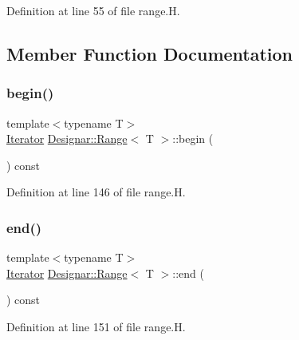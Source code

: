 Definition at line 55 of file range.\+H.



\subsection{Member Function Documentation}
\mbox{\label{class_designar_1_1_range_af26fe1974236b1a3ff61992986349b5f}} 
\subsubsection{\texorpdfstring{begin()}{begin()}}
{\footnotesize\ttfamily template$<$typename T$>$ \\
\hyperlink{class_designar_1_1_range_1_1_iterator}{Iterator} \hyperlink{class_designar_1_1_range}{Designar\+::\+Range}$<$ T $>$\+::begin (\begin{DoxyParamCaption}{ }\end{DoxyParamCaption}) const\hspace{0.3cm}{\ttfamily [inline]}}



Definition at line 146 of file range.\+H.

\mbox{\label{class_designar_1_1_range_ab764bbefe3e28a17886e1093371d0e50}} 
\subsubsection{\texorpdfstring{end()}{end()}}
{\footnotesize\ttfamily template$<$typename T$>$ \\
\hyperlink{class_designar_1_1_range_1_1_iterator}{Iterator} \hyperlink{class_designar_1_1_range}{Designar\+::\+Range}$<$ T $>$\+::end (\begin{DoxyParamCaption}{ }\end{DoxyParamCaption}) const\hspace{0.3cm}{\ttfamily [inline]}}



Definition at line 151 of file range.\+H.

\mbox{\label{class_designar_1_1_range_a2f272a5b8100003b052a77bd48f342cd}} 
